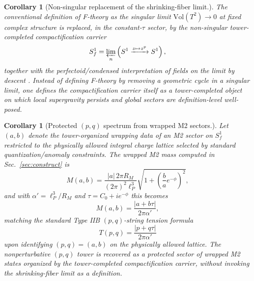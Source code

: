 \documentclass[11pt]{article}
\newtheorem{corollary}[theorem]{Corollary}
\theoremstyle{remark}
\begin{document}
\begin{corollary}[Non-singular replacement of the shrinking-fiber limit.] The conventional definition of F-theory as the singular limit \(\mathrm{Vol}(T^{2})\to 0\) at fixed complex structure is replaced, in the constant-\(\tau\) sector, by the non-singular tower-completed compactification carrier
\begin{equation} \label{eq:sf1-invlimit}
S_f^{1}=\varprojlim_{n}\left(S^{1}\xrightarrow{z\mapsto z^{p}}S^{1}\right),
\end{equation}
together with the perfectoid/condensed interpretation of fields on the limit by descent \cite{ClausenScholze, Scholze2012}. Instead of defining F-theory by removing a geometric cycle in a singular limit, one defines the compactification carrier itself as a tower-completed object on which local supergravity persists and global sectors are definition-level well-posed. 
\end{corollary}
\begin{corollary}[Protected \((p,q)\) spectrum from wrapped M2 sectors.] Let \((a,b)\) denote the tower-organized wrapping data of an M2 sector on \(S_f^{1}\) restricted to the physically allowed integral charge lattice selected by standard quantization/anomaly constraints. The wrapped M2 mass computed in Sec.~\ref{sec:construct} is
\begin{equation} \label{eq:M2-mass}
M(a,b)=\frac{|a|\,2\pi R_M}{(2\pi)^2\ell_{P}^{3}}\sqrt{1+\left(\frac{b}{a}e^{-\phi}\right)^{2}},
\end{equation}
and with \(\alpha'=\ell_{P}^{3}/R_{M}\) and \(\tau=C_{0}+ie^{-\phi}\) this becomes
\begin{equation}\label{eq:M2-to-pq}
M(a,b)=\frac{|a+b\tau|}{2\pi\alpha'},
\end{equation}
matching the standard Type IIB \((p,q)\)-string tension formula
\begin{equation}\label{eq:pq-tension}
T(p,q)=\frac{|p+q\tau|}{2\pi\alpha'}
\end{equation}
upon identifying \((p,q)=(a,b)\) on the physically allowed lattice. The nonperturbative \((p,q)\) tower is recovered as a protected sector of wrapped M2 states organized by the tower-completed compactification carrier, without invoking the shrinking-fiber limit as a definition. 
\end{corollary}
\end{document}

